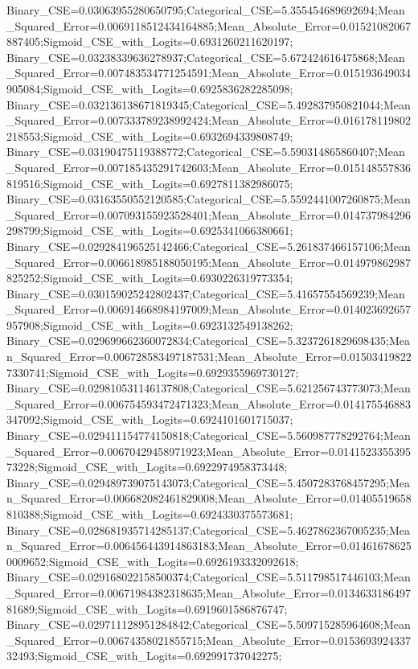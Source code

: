 Binary_CSE=0.03063955280650795;Categorical_CSE=5.355454689692694;Mean_Squared_Error=0.0069118512434164885;Mean_Absolute_Error=0.01521082067887405;Sigmoid_CSE_with_Logits=0.6931260211620197;
Binary_CSE=0.03238339636278937;Categorical_CSE=5.672424616475868;Mean_Squared_Error=0.007483534771254591;Mean_Absolute_Error=0.015193649034905084;Sigmoid_CSE_with_Logits=0.6925836282285098;
Binary_CSE=0.032136138671819345;Categorical_CSE=5.492837950821044;Mean_Squared_Error=0.007333789238992424;Mean_Absolute_Error=0.016178119802218553;Sigmoid_CSE_with_Logits=0.6932694339808749;
Binary_CSE=0.03190475119388772;Categorical_CSE=5.590314865860407;Mean_Squared_Error=0.007185435291742603;Mean_Absolute_Error=0.015148557836819516;Sigmoid_CSE_with_Logits=0.6927811382986075;
Binary_CSE=0.03163550552120585;Categorical_CSE=5.5592441007260875;Mean_Squared_Error=0.007093155923528401;Mean_Absolute_Error=0.014737984296298799;Sigmoid_CSE_with_Logits=0.6925341066380661;
Binary_CSE=0.029284196525142466;Categorical_CSE=5.261837466157106;Mean_Squared_Error=0.006618985188050195;Mean_Absolute_Error=0.014979862987825252;Sigmoid_CSE_with_Logits=0.6930226319773354;
Binary_CSE=0.030159025242802437;Categorical_CSE=5.41657554569239;Mean_Squared_Error=0.006914668984197009;Mean_Absolute_Error=0.014023692657957908;Sigmoid_CSE_with_Logits=0.6923132549138262;
Binary_CSE=0.029699662360072834;Categorical_CSE=5.3237261829698435;Mean_Squared_Error=0.006728583497187531;Mean_Absolute_Error=0.015034198227330741;Sigmoid_CSE_with_Logits=0.6929355969730127;
Binary_CSE=0.029810531146137808;Categorical_CSE=5.621256743773073;Mean_Squared_Error=0.006754593472471323;Mean_Absolute_Error=0.014175546883347092;Sigmoid_CSE_with_Logits=0.6924101601715037;
Binary_CSE=0.029411154774150818;Categorical_CSE=5.560987778292764;Mean_Squared_Error=0.00670429458971923;Mean_Absolute_Error=0.014152335539573228;Sigmoid_CSE_with_Logits=0.6922974958373448;
Binary_CSE=0.029489739075143073;Categorical_CSE=5.4507283768457295;Mean_Squared_Error=0.006682082461829008;Mean_Absolute_Error=0.01405519658810388;Sigmoid_CSE_with_Logits=0.6924330375573681;
Binary_CSE=0.028681935714285137;Categorical_CSE=5.4627862367005235;Mean_Squared_Error=0.006456443914863183;Mean_Absolute_Error=0.014616786250009652;Sigmoid_CSE_with_Logits=0.6926193332092618;
Binary_CSE=0.029168022158500374;Categorical_CSE=5.511798517446103;Mean_Squared_Error=0.00671984382318635;Mean_Absolute_Error=0.013463318649781689;Sigmoid_CSE_with_Logits=0.6919601586876747;
Binary_CSE=0.029711128951284842;Categorical_CSE=5.509715285964608;Mean_Squared_Error=0.00674358021855715;Mean_Absolute_Error=0.015369392433732493;Sigmoid_CSE_with_Logits=0.692991737042275;
